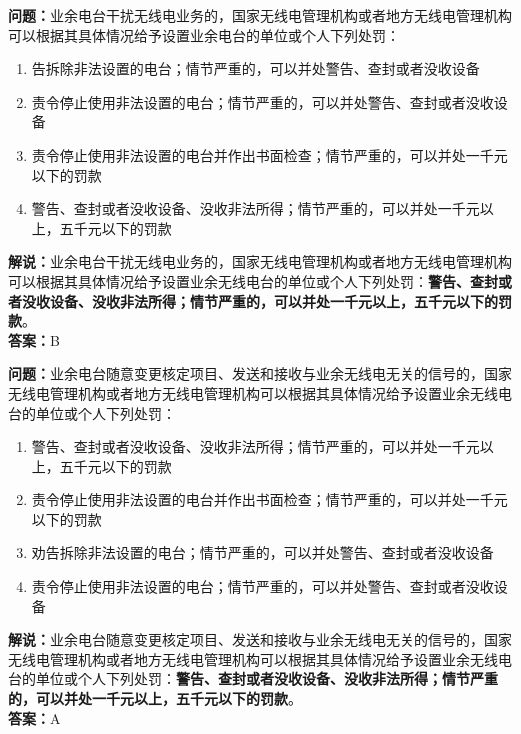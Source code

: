 \noindent\textbf{问题：}业余电台干扰无线电业务的，国家无线电管理机构或者地方无线电管理机构可以根据其具体情况给予设置业余电台的单位或个人下列处罚：
\begin{enumerate}[label=\Alph*), leftmargin=3em]
	\item  告拆除非法设置的电台；情节严重的，可以并处警告、查封或者没收设备
	\item  责令停止使用非法设置的电台；情节严重的，可以并处警告、查封或者没收设备
	\item  责令停止使用非法设置的电台并作出书面检查；情节严重的，可以并处一千元以下的罚款
	\item  警告、查封或者没收设备、没收非法所得；情节严重的，可以并处一千元以上，五千元以下的罚款
\end{enumerate}
\noindent\textbf{解说：}业余电台干扰无线电业务的，国家无线电管理机构或者地方无线电管理机构可以根据其具体情况给予设置业余无线电台的单位或个人下列处罚：\textbf{警告、查封或者没收设备、没收非法所得；情节严重的，可以并处一千元以上，五千元以下的罚款}。\\\noindent\textbf{答案：}B


\bigskip


\noindent\textbf{问题：}业余电台随意变更核定项目、发送和接收与业余无线电无关的信号的，国家无线电管理机构或者地方无线电管理机构可以根据其具体情况给予设置业余无线电台的单位或个人下列处罚：
\begin{enumerate}[label=\Alph*), leftmargin=3em]
	\item  警告、查封或者没收设备、没收非法所得；情节严重的，可以并处一千元以上，五千元以下的罚款
	\item  责令停止使用非法设置的电台并作出书面检查；情节严重的，可以并处一千元以下的罚款
	\item  劝告拆除非法设置的电台；情节严重的，可以并处警告、查封或者没收设备
	\item  责令停止使用非法设置的电台；情节严重的，可以并处警告、查封或者没收设备
\end{enumerate}
\noindent\textbf{解说：}业余电台随意变更核定项目、发送和接收与业余无线电无关的信号的，国家无线电管理机构或者地方无线电管理机构可以根据其具体情况给予设置业余无线电台的单位或个人下列处罚：\textbf{警告、查封或者没收设备、没收非法所得；情节严重的，可以并处一千元以上，五千元以下的罚款}。\\\noindent\textbf{答案：}A


\bigskip


